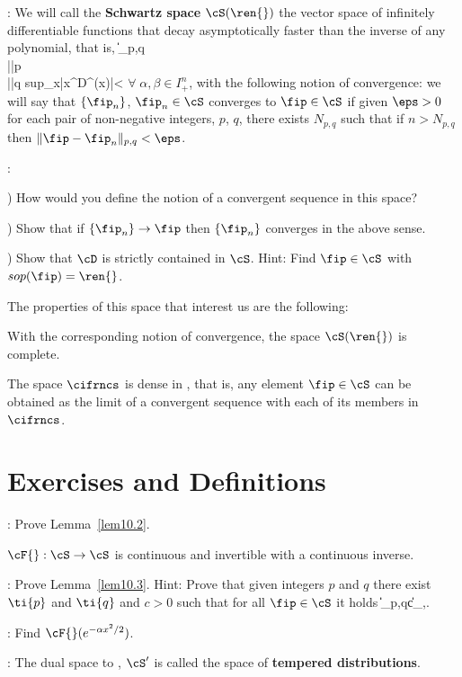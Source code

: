 \espa
{}: 
We will call the {\bf Schwartz space} $\cS(\ren{})$ 
the vector space
of infinitely differentiable functions that decay
asymptotically faster than the inverse of any polynomial,
that is, 
\beq
\|\fip\|_{p,q}\equiv
{} {\dip\sum} \\ {|\ti{\alpha}|\leq p} \\
{|\ti\beta|\leq q}
\earr 
sup_{x\in\ren{}}|x^{\alpha}D^{\beta}\fip(x)|<\ifi
\label{10.f5}
\eeq
$\forall\;\alpha,\beta\in I_+^n$, with the following notion of convergence: 
we will say that $\{\fip_n\}$, $\fip_n \in \cS$ converges to $\fip\in\cS$ if given $\eps>0$
for each pair of non-negative integers, $p$, $q$, there exists $N_{p,q}$ such that 
if $n>N_{p,q}$ then $\|\fip-\fip_n\|_{p,q}<\eps$.

\espa
\noi
{}:

) How would you define the notion of a convergent sequence in
this space?

) Show that if $\{\fip_n\}\to \fip$ then $\{\fip_n\}$ 
converges in the above sense.

) Show that $\cD$ is strictly contained in $\cS$. 
Hint: Find $\fip\in\cS$ with $sop(\fip)=\ren{}$.
\espa

The properties of this space that interest us are the following:

\blem
With the corresponding notion of convergence, the
space $\cS(\ren{})$ is complete.
\elem

\blem 
\label{lem10.2}
The space $\cifrncs$ is dense in \cS, that is, any element 
$\fip\in\cS$
can be obtained as the limit of a convergent sequence with
each of its members in $\cifrncs$.
\elem

\section{Exercises and Definitions}

\ejer: Prove Lemma~\ref{lem10.2}.

\blem
\label{lem10.3}
$\cF{}:\cS\to\cS$ is continuous and invertible with a continuous inverse.
\elem

\ejer: 
Prove Lemma~\ref{lem10.3}. Hint: Prove that given integers $p$ and $q$
there exist $\ti{p}$ and $\ti{q}$  
and $c>0$ such that for all $\fip\in\cS$ it holds
\beq
\|\hat{\fip}\|_{p,q}\leq c\;\|\fip\|_{,}.
\eeq

\ejer: 
Find $\cF{}(e^{-\alpha x^2/2})$.

:
The dual space to \cS, $\cS'$ is called the space 
of {\bf tempered distributions}.

